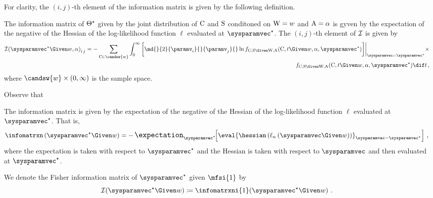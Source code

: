 \documentclass[../main.tex]{subfiles}
\begin{document}
For clarity, the $(i,j)$-th element of the information matrix is given by the following definition.
\begin{definition}
The information matrix of ${\Theta}^{\star}$ given by the joint distribution of $\mathrm{C}$ and $\mathrm{S}$ conditoned on $\mathrm{W} = w$ and $\mathrm{A} = \alpha$ is gyven by the expectation of the negative of the Hessian of the log-likelihood function $\ell$ evaluated at $\tparam\sysparamvec$.
The $(i,j)$-th element of $\mathcal{I}$ is given by
\begin{equation}
\begin{split}
\label{eq:info_matrix_el}
\infomatrx\!\left(\tparam\sysparamvec \Given w, \alpha\right)_{i\,j}
= -\sum_{\cand \in \candsw{w}} \int_{0}^{\infty}
{
	\biggl[
	\md{}{2}{\paramv_i}{}{\paramv_j}{}
	\ln \pdf_{\rvcand,\sv \Given \RV{W},\RV{A}}(\cand, t \Given w, \alpha, \tparam\sysparamvec)
	\biggr]
}
\bigg \rvert_{\sysparamvec=\tparam\sysparamvec} \times\\
\qquad \pdf_{\rvcand,\sv \Given \RV{W},\RV{A}}(\cand, t \Given w, \alpha, \tparam\sysparamvec) \dif t\,,
\end{split}
\end{equation}
where $\candsw{w} \times (0,\infty)$ is the sample space.
\end{definition}

Observe that 

\begin{definition}
The information matrix is given by the expectation of the negative of the Hessian of the log-likelihood function $\ell$ evaluated at $\tparam\sysparamvec$. That is,
\begin{equation}
\label{eq:info_matrix}
    \infomatrxn\left(\tparam\sysparamvec\Given w\right) = -\operatorname{\mathlarger{\expectation}_{\tparam\sysparamvec}}\!\!
    \left[
        \eval
        {
            \hessian \left(
                \ell_n\left(\sysparamvec \Given w \right)
            \right)
        }_{\sysparamvec=\tparam\sysparamvec} 
    \right ]\,,
\end{equation}
where the expectation is taken with respect to $\tparam\sysparamvec$ and the Hessian is taken with respect to $\sysparamvec$ and then evaluated at $\tparam\sysparamvec$.
\end{definition}

\begin{notation}
We denote the Fisher information matrix of $\tparam\sysparamvec$ given $\mfsi{1}$ by
\begin{equation}
   \infomatrx\!\left(\tparam\sysparamvec \Given w\right) \coloneqq \infomatrxni{1}\!\left(\tparam\sysparamvec \Given w\right)\,.
\end{equation}
\end{notation}
\end{document}
